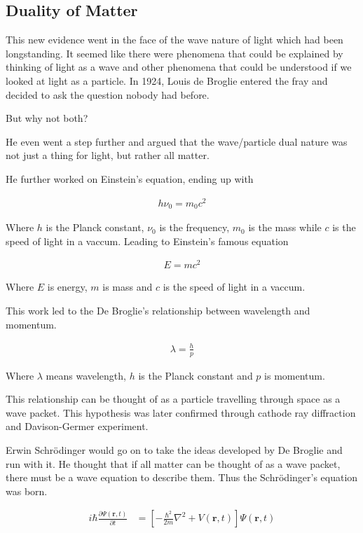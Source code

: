 \subsection{Duality of Matter}This new evidence went in the face of the wave nature of light which had been longstanding.
It seemed like  there were phenomena that could be explained by thinking of light as a wave and other phenomena that could be understood if we looked at light as a particle.
In 1924, Louis de Broglie entered the fray and decided to ask the question nobody had before.

But why not both?

He even went a step further and argued that the wave/particle dual nature was not just a thing for light, but rather all matter.

He further worked on Einstein's equation, ending up with

\begin{align}
  h \nu_0 = m_0 c^2
\end{align}

Where $h$ is the Planck constant, $\nu_0$ is the frequency, $m_0$ is the mass while $c$ is the speed of light in a vaccum. Leading to Einstein's famous equation

\begin{align}
  E = m c^2
\end{align}

Where $E$ is energy, $m$ is mass and $c$ is the speed of light in a vaccum.

This work led to the De Broglie's relationship between wavelength and momentum.

\begin{align}
  \lambda = \frac{h}{p}  
\end{align}

Where $\lambda$ means wavelength, $h$ is the Planck constant and $p$ is momentum.

This relationship can be thought of as a particle travelling through space as a wave packet.
This hypothesis was later confirmed through cathode ray diffraction and Davison-Germer experiment.

Erwin Schrödinger would go on to take the ideas developed by De Broglie and run with it.
He thought that if all matter can be thought of as a wave packet, there must be a wave equation to describe them.
Thus the  Schrödinger's equation was born.

\begin{align}
  i \hbar \frac{\partial \Psi(\mathbf{r}, t)}{\partial t} &= \left[ -\frac{\hbar^2}{2m} \nabla^2 + V(\mathbf{r}, t) \right] \Psi(\mathbf{r}, t) 
\end{align}

